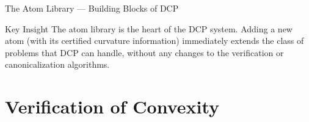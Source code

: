 \documentclass[aspectratio=169,10pt]{beamer}
\begin{document}
\begin{frame}[allowframebreaks]{The Atom Library --- Building Blocks of DCP}
  \begin{alertblock}{Key Insight}
    The atom library is the heart of the DCP system.  Adding a new atom
    (with its certified curvature information) immediately extends the
    class of problems that DCP can handle, without any changes to the
    verification or canonicalization algorithms.
  \end{alertblock}

\end{frame}

\section{Verification of Convexity}
\end{document}

